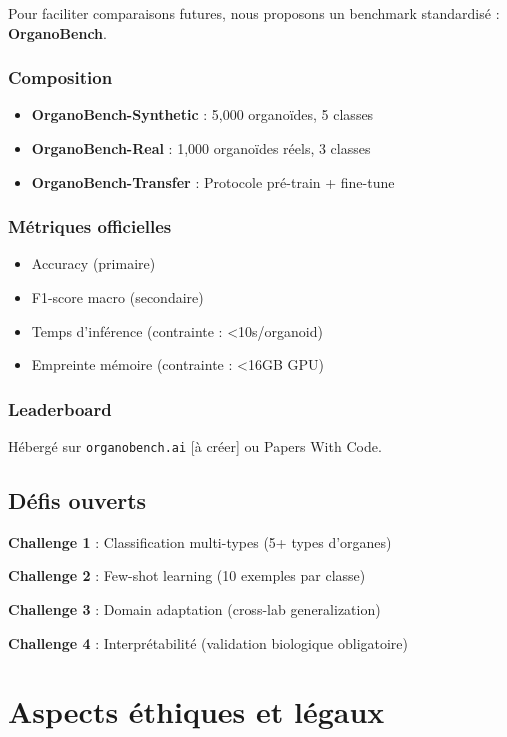 Pour faciliter comparaisons futures, nous proposons un benchmark standardisé : \textbf{OrganoBench}.

\subsubsection{Composition}

\begin{itemize}
    \item \textbf{OrganoBench-Synthetic} : 5,000 organoïdes, 5 classes
    \item \textbf{OrganoBench-Real} : 1,000 organoïdes réels, 3 classes
    \item \textbf{OrganoBench-Transfer} : Protocole pré-train + fine-tune
\end{itemize}

\subsubsection{Métriques officielles}

\begin{itemize}
    \item Accuracy (primaire)
    \item F1-score macro (secondaire)
    \item Temps d'inférence (contrainte : <10s/organoid)
    \item Empreinte mémoire (contrainte : <16GB GPU)
\end{itemize}

\subsubsection{Leaderboard}

Hébergé sur \texttt{organobench.ai} [à créer] ou Papers With Code.

\subsection{Défis ouverts}

\textbf{Challenge 1} : Classification multi-types (5+ types d'organes)

\textbf{Challenge 2} : Few-shot learning (10 exemples par classe)

\textbf{Challenge 3} : Domain adaptation (cross-lab generalization)

\textbf{Challenge 4} : Interprétabilité (validation biologique obligatoire)

\section{Aspects éthiques et légaux}

